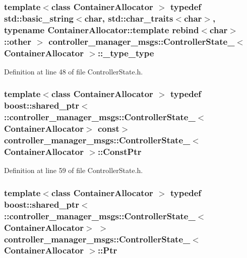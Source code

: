 \subsubsection[{\-\_\-type\-\_\-type}]{\setlength{\rightskip}{0pt plus 5cm}template$<$class Container\-Allocator $>$ typedef std\-::basic\-\_\-string$<$char, std\-::char\-\_\-traits$<$char$>$, typename \-Container\-Allocator\-::template rebind$<$char$>$\-::other $>$ {\bf controller\-\_\-manager\-\_\-msgs\-::\-Controller\-State\-\_\-}$<$ \-Container\-Allocator $>$\-::{\bf \-\_\-type\-\_\-type}}\label{structcontroller__manager__msgs_1_1ControllerState___afcc2b4d41e57c4aaccd14be40344e75a}


\-Definition at line 48 of file \-Controller\-State.\-h.

\subsubsection[{\-Const\-Ptr}]{\setlength{\rightskip}{0pt plus 5cm}template$<$class Container\-Allocator $>$ typedef boost\-::shared\-\_\-ptr$<$ \-::{\bf controller\-\_\-manager\-\_\-msgs\-::\-Controller\-State\-\_\-}$<$\-Container\-Allocator$>$ const$>$ {\bf controller\-\_\-manager\-\_\-msgs\-::\-Controller\-State\-\_\-}$<$ \-Container\-Allocator $>$\-::{\bf \-Const\-Ptr}}\label{structcontroller__manager__msgs_1_1ControllerState___a0b0b7e072dec92914364219ffb10d924}


\-Definition at line 59 of file \-Controller\-State.\-h.

\subsubsection[{\-Ptr}]{\setlength{\rightskip}{0pt plus 5cm}template$<$class Container\-Allocator $>$ typedef boost\-::shared\-\_\-ptr$<$ \-::{\bf controller\-\_\-manager\-\_\-msgs\-::\-Controller\-State\-\_\-}$<$\-Container\-Allocator$>$ $>$ {\bf controller\-\_\-manager\-\_\-msgs\-::\-Controller\-State\-\_\-}$<$ \-Container\-Allocator $>$\-::{\bf \-Ptr}}\label{structcontroller__manager__msgs_1_1ControllerState___a344cc18ccf8a36ed61b26ff7e54d074f}


